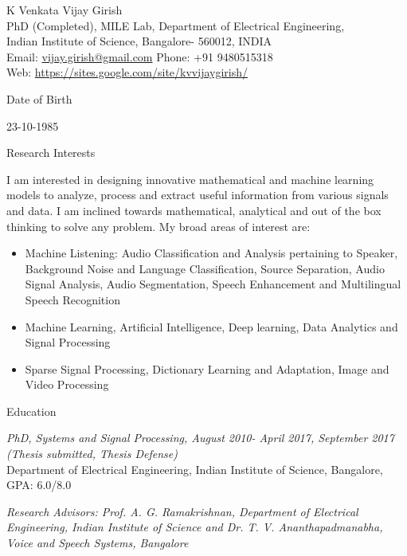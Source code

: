 \documentclass[10pt]{article}
\newenvironment{subbulletlist}{%
	\begin{list}{\labelitemii}{%
		\setlength{\topsep}{\itemsep}\setlength{\parskip}{\parsep}%
	}%
}%
{ \end{list} }
\begin{document}
\newlength{\oldcvlabelwidth}
\newlength{\oldcvlabelsep}

\begin{cv}{{\large K Venkata Vijay Girish}\\
{ \normalsize  PhD (Completed), MILE Lab, Department of Electrical Engineering, \\Indian Institute of Science, Bangalore- 560012, INDIA
\\
Email: {\mdseries \href{mailto:vijay.girish@gmail.com}
	{vijay.girish@gmail.com}}
\hfill Phone: {\mdseries +91 9480515318} \hfill \\
Web: {\mdseries \href{https://sites.google.com/site/kvvijaygirish/}
	{https://sites.google.com/site/kvvijaygirish/}}}
}

\setlength{\oldcvlabelwidth}{\cvlabelwidth}
\setlength{\oldcvlabelsep}{\cvlabelsep}

\setlength{\cvlabelwidth}{1em}


\setlength{\cvlabelwidth}{0em}
\setlength{\cvlabelsep}{\labelsep}
\begin{cvlist}{Date of Birth}\item
23-10-1985
\end{cvlist}


\begin{cvlist}{Research Interests}
\item 
I am  interested in designing innovative mathematical and machine learning models to analyze, process and extract useful information from various signals and data. I am inclined towards mathematical, analytical and  out of the box thinking to solve any problem. 
 My broad areas of interest are:
\begin{itemize}\itemsep=0.25em
	\item Machine Listening: Audio Classification and Analysis pertaining to Speaker, Background Noise and Language Classification, Source Separation, Audio Signal Analysis, Audio Segmentation, Speech Enhancement and Multilingual Speech Recognition
	
 \item Machine Learning, Artificial Intelligence, Deep learning, Data Analytics and Signal Processing
 
% 
\item Sparse Signal Processing, Dictionary Learning and Adaptation, Image and Video  Processing

\end{itemize}
\end{cvlist}


\begin{cvlist}{Education}
	\item \emph{PhD, Systems and Signal Processing, August 2010- April 2017, September 2017 (Thesis submitted, Thesis Defense)}\\
	Department of Electrical
Engineering, Indian Institute of Science, Bangalore, GPA: 6.0/8.0
	\begin{subbulletlist}
		\item \emph{Research Advisors: Prof. A. G. Ramakrishnan, Department of Electrical Engineering, Indian Institute of Science and Dr. T. V. Ananthapadmanabha, Voice and Speech Systems, Bangalore
}
		

\end{subbulletlist}
\end{cvlist}
\end{cv}
\end{document}
